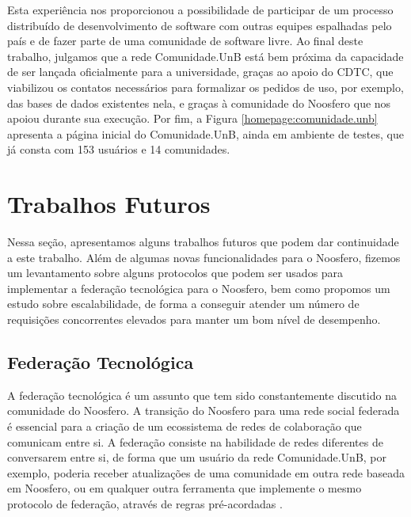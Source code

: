 Esta experiência nos proporcionou a possibilidade de participar de um processo
distribuído de desenvolvimento de software com outras equipes espalhadas pelo
país e de fazer parte de uma comunidade de software livre.
%
Ao final deste trabalho, julgamos que a rede Comunidade.UnB está bem próxima
da capacidade de ser lançada oficialmente para a universidade, graças ao
apoio do CDTC, que viabilizou os contatos necessários para formalizar os
pedidos de uso, por exemplo, das bases de dados existentes nela, e graças
à comunidade do Noosfero que nos apoiou durante sua execução.
%
Por fim, a Figura \ref{homepage:comunidade.unb} apresenta a página inicial do
Comunidade.UnB, ainda em ambiente de testes, que já consta com 153 usuários
e 14 comunidades.

\section{Trabalhos Futuros}

Nessa seção, apresentamos alguns trabalhos futuros que podem dar continuidade a
este trabalho. Além de algumas novas funcionalidades para o Noosfero, fizemos
um levantamento sobre alguns protocolos que podem ser usados para implementar a
federação tecnológica para o Noosfero, bem como propomos um estudo sobre
escalabilidade, de forma a conseguir atender um número de requisições
concorrentes elevados para manter um bom nível de desempenho.

\subsection{Federação Tecnológica}

A federação tecnológica é um assunto que tem sido constantemente discutido
na comunidade do Noosfero. A transição do Noosfero para uma rede social federada
é essencial para a criação de um ecossistema de redes de colaboração que
comunicam entre si.
%
A federação consiste na habilidade de redes diferentes de conversarem entre si,
de forma que um usuário da rede Comunidade.UnB, por exemplo, poderia receber
atualizações de uma comunidade em outra rede baseada em Noosfero, ou em
qualquer outra ferramenta que implemente o mesmo protocolo de federação,
através de regras pré-acordadas \cite{prodomou2010}.

